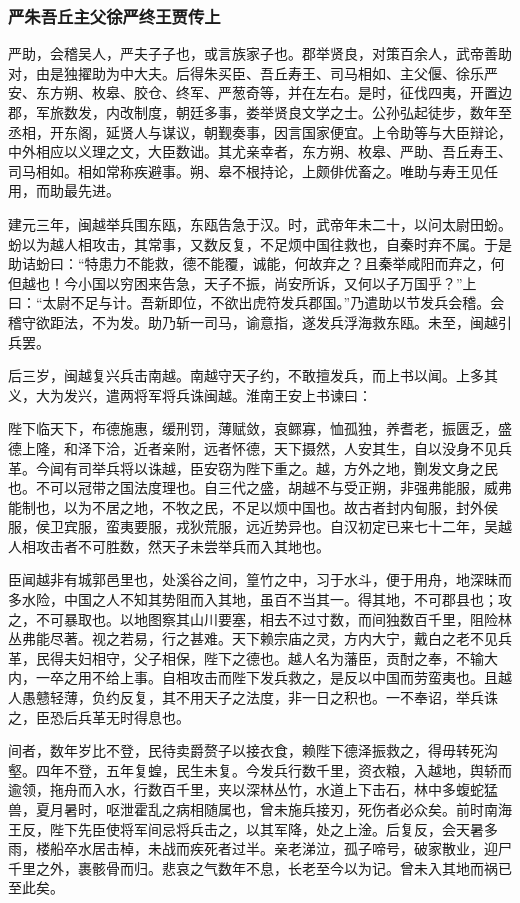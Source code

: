 \documentclass[]{article}
\begin{document}
\hypertarget{header-n4830}{%
\subsubsection{严朱吾丘主父徐严终王贾传上}\label{header-n4830}}

严助，会稽吴人，严夫子子也，或言族家子也。郡举贤良，对策百余人，武帝善助对，由是独擢助为中大夫。后得朱买臣、吾丘寿王、司马相如、主父偃、徐乐严安、东方朔、枚皋、胶仓、终军、严葱奇等，并在左右。是时，征伐四夷，开置边郡，军旅数发，内改制度，朝廷多事，娄举贤良文学之士。公孙弘起徒步，数年至丞相，开东阁，延贤人与谋议，朝觐奏事，因言国家便宜。上令助等与大臣辩论，中外相应以义理之文，大臣数诎。其尤亲幸者，东方朔、枚皋、严助、吾丘寿王、司马相如。相如常称疾避事。朔、皋不根持论，上颇俳优畜之。唯助与寿王见任用，而助最先进。

建元三年，闽越举兵围东瓯，东瓯告急于汉。时，武帝年未二十，以问太尉田蚡。蚡以为越人相攻击，其常事，又数反复，不足烦中国往救也，自秦时弃不属。于是助诘蚡曰：``特患力不能救，德不能覆，诚能，何故弃之？且秦举咸阳而弃之，何但越也！今小国以穷困来告急，天子不振，尚安所诉，又何以子万国乎？''上曰：``太尉不足与计。吾新即位，不欲出虎符发兵郡国。''乃遣助以节发兵会稽。会稽守欲距法，不为发。助乃斩一司马，谕意指，遂发兵浮海救东瓯。未至，闽越引兵罢。

后三岁，闽越复兴兵击南越。南越守天子约，不敢擅发兵，而上书以闻。上多其义，大为发兴，遣两将军将兵诛闽越。淮南王安上书谏曰：

陛下临天下，布德施惠，缓刑罚，薄赋敛，哀鳏寡，恤孤独，养耆老，振匮乏，盛德上隆，和泽下洽，近者亲附，远者怀德，天下摄然，人安其生，自以没身不见兵革。今闻有司举兵将以诛越，臣安窃为陛下重之。越，方外之地，劗发文身之民也。不可以冠带之国法度理也。自三代之盛，胡越不与受正朔，非强弗能服，威弗能制也，以为不居之地，不牧之民，不足以烦中国也。故古者封内甸服，封外侯服，侯卫宾服，蛮夷要服，戎狄荒服，远近势异也。自汉初定已来七十二年，吴越人相攻击者不可胜数，然天子未尝举兵而入其地也。

臣闻越非有城郭邑里也，处溪谷之间，篁竹之中，习于水斗，便于用舟，地深昧而多水险，中国之人不知其势阻而入其地，虽百不当其一。得其地，不可郡县也；攻之，不可暴取也。以地图察其山川要塞，相去不过寸数，而间独数百千里，阻险林丛弗能尽著。视之若易，行之甚难。天下赖宗庙之灵，方内大宁，戴白之老不见兵革，民得夫妇相守，父子相保，陛下之德也。越人名为藩臣，贡酎之奉，不输大内，一卒之用不给上事。自相攻击而陛下发兵救之，是反以中国而劳蛮夷也。且越人愚戆轻薄，负约反复，其不用天子之法度，非一日之积也。一不奉诏，举兵诛之，臣恐后兵革无时得息也。

间者，数年岁比不登，民待卖爵赘子以接衣食，赖陛下德泽振救之，得毋转死沟壑。四年不登，五年复蝗，民生未复。今发兵行数千里，资衣粮，入越地，舆轿而逾领，拖舟而入水，行数百千里，夹以深林丛竹，水道上下击石，林中多蝮蛇猛兽，夏月暑时，呕泄霍乱之病相随属也，曾未施兵接刃，死伤者必众矣。前时南海王反，陛下先臣使将军间忌将兵击之，以其军降，处之上淦。后复反，会天暑多雨，楼船卒水居击棹，未战而疾死者过半。亲老涕泣，孤子啼号，破家散业，迎尸千里之外，裹骸骨而归。悲哀之气数年不息，长老至今以为记。曾未入其地而祸已至此矣。
\end{document}
